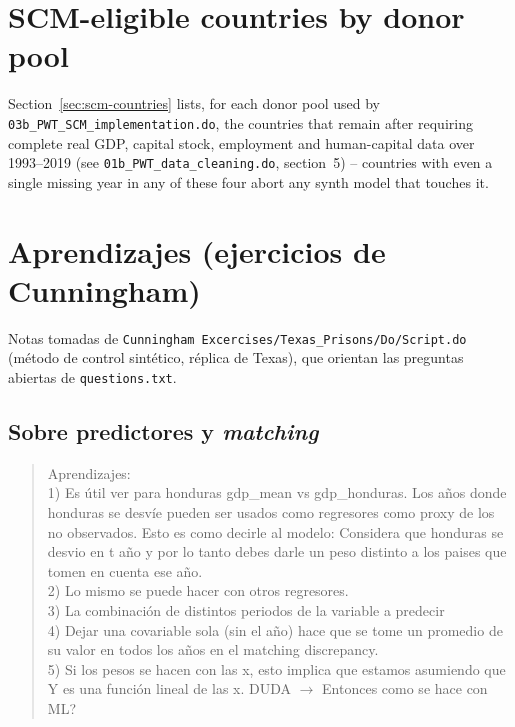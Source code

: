 \documentclass[11pt]{article}
\begin{document}
\begingroup
\scriptsize
\setlength{\tabcolsep}{3pt}

\endgroup

\FloatBarrier
\section{SCM-eligible countries by donor pool}

Section~\ref{sec:scm-countries} lists, for each donor pool used by
\texttt{03b\_PWT\_SCM\_implementation.do}, the countries that remain after
requiring complete real GDP, capital stock, employment and human-capital data
over 1993--2019 (see \texttt{01b\_PWT\_data\_cleaning.do}, section~5) --
countries with even a single missing year in any of these four abort any
synth model that touches it.
\label{sec:scm-countries}



\FloatBarrier
\section{Aprendizajes (ejercicios de Cunningham)}

Notas tomadas de \texttt{Cunningham Excercises/Texas\_Prisons/Do/Script.do}
(m\'etodo de control sint\'etico, r\'eplica de Texas), que orientan las
preguntas abiertas de \texttt{questions.txt}.

\subsection*{Sobre predictores y \emph{matching}}
\begin{quote}
\noindent Aprendizajes: \\
1) Es útil ver para honduras gdp\_mean vs gdp\_honduras. Los años donde honduras
se desvíe pueden ser usados como regresores como proxy de los no observados.
Esto es como decirle al modelo: Considera que honduras se desvio en t año y por
lo tanto debes darle un peso distinto a los paises que tomen en cuenta ese año. \\
2) Lo mismo se puede hacer con otros regresores. \\
3) La combinación de distintos periodos de la variable a predecir \\
4) Dejar una covariable sola (sin el año) hace que se tome un promedio de su
valor en todos los años en el matching discrepancy. \\
5) Si los pesos se hacen con las x, esto implica que estamos asumiendo que
Y es una función lineal de las x. DUDA $\to$ Entonces como se hace con ML?
\end{quote}
\end{document}
